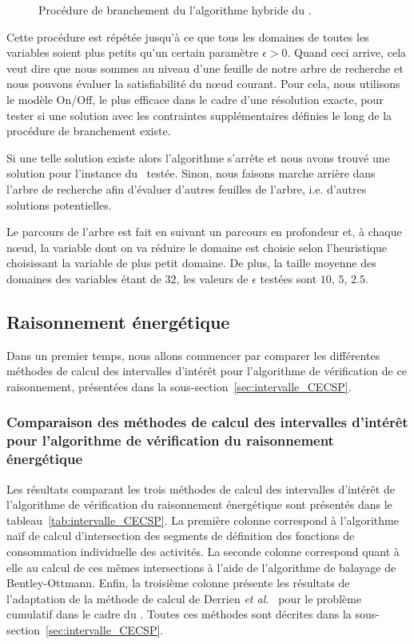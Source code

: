 \begin{figure}[!htb] 
  
  \caption{Procédure de branchement du l'algorithme hybride du \CECSP.}
  \label{fig:branching}
\end{figure}

Cette procédure est répétée jusqu'à ce que tous les domaines de toutes
les variables soient plus petits qu'un certain paramètre $\epsilon
>0$. Quand ceci arrive, cela veut dire que nous sommes au niveau d'une
feuille de notre arbre de recherche et nous pouvons évaluer la
satisfiabilité du n\oe ud courant. Pour cela, nous utilisons le modèle
On/Off, le plus efficace dans le cadre d'une résolution exacte, pour
tester si une solution avec les contraintes supplémentaires définies
le long de la procédure de branchement existe.

Si une telle solution existe alors l'algorithme s'arrête et nous avons
trouvé une solution pour l'instance du \CECSP~testée. Sinon, nous
faisons marche arrière dans l'arbre de recherche afin d'évaluer
d'autres feuilles de l'arbre, i.e. d'autres solutions potentielles. 

Le parcours de l'arbre est fait en suivant un parcours en profondeur
et, à chaque n\oe ud, la variable dont on va réduire le domaine est
choisie selon l'heuristique choisissant la variable de plus petit
domaine.  De plus, la taille moyenne des domaines des variables étant
de $32$, les valeurs de $\epsilon$ testées sont $10$, $5$, $2.5$.

\subsection{Raisonnement énergétique}
\label{sec:expe_RE}

Dans un premier temps, nous allons commencer par comparer les
différentes méthodes de calcul des intervalles d'intérêt pour
l'algorithme de vérification de ce raisonnement, présentées dans la
sous-section~\ref{sec:intervalle_CECSP}. 

\subsubsection{Comparaison des méthodes de calcul des intervalles
  d'intérêt pour l'algorithme de vérification du raisonnement
  énergétique}

Les résultats comparant les trois méthodes de calcul des intervalles
d'intérêt de l'algorithme de vérification du raisonnement énergétique
sont présentés dans le tableau~\ref{tab:intervalle_CECSP}. La première
colonne correspond à l'algorithme naïf de calcul d'intersection des
segments de définition des fonctions de consommation individuelle des
activités. La seconde colonne correspond quant à elle au calcul de ces
mêmes intersections à l'aide de l'algorithme de balayage de
Bentley-Ottmann. Enfin, la troisième colonne présente les résultats de
l'adaptation de la méthode de calcul de Derrien {\it et al.}~\cite{DP}
pour le problème cumulatif dans le cadre du \CECSP. Toutes ces
méthodes sont décrites dans la sous-section~\ref{sec:intervalle_CECSP}.

